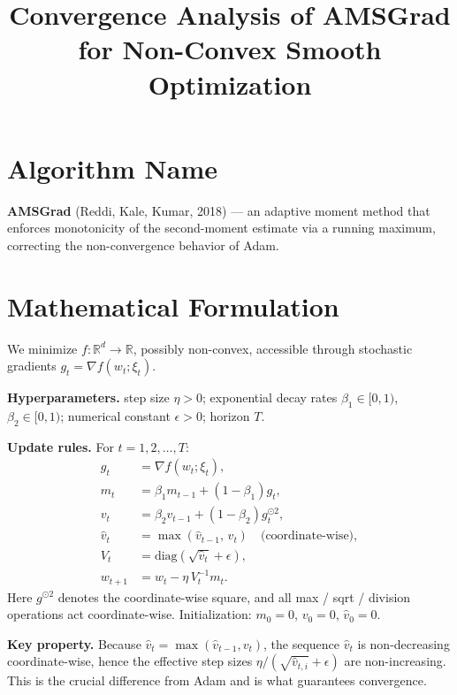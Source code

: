 \documentclass[11pt]{article}
\title{Convergence Analysis of AMSGrad for Non-Convex Smooth Optimization}
\author{}
\date{}
\begin{document}
\maketitle

\section*{Algorithm Name}
\textbf{AMSGrad} (Reddi, Kale, Kumar, 2018) --- an adaptive moment method that
enforces monotonicity of the second-moment estimate via a running maximum,
correcting the non-convergence behavior of Adam.

\section*{Mathematical Formulation}

We minimize $f:\mathbb{R}^d \to \mathbb{R}$, possibly non-convex, accessible
through stochastic gradients $g_t = \nabla f(w_t;\xi_t)$.

\textbf{Hyperparameters.} step size $\eta>0$; exponential decay rates
$\beta_1\in[0,1)$, $\beta_2\in[0,1)$; numerical constant $\epsilon>0$;
horizon $T$.

\textbf{Update rules.} For $t = 1,2,\dots,T$:
\begin{align}
g_t      &= \nabla f(w_t;\xi_t), \\
m_t      &= \beta_1 m_{t-1} + (1-\beta_1) g_t, \\
v_t      &= \beta_2 v_{t-1} + (1-\beta_2) g_t^{\odot 2}, \\
\hat v_t &= \max(\hat v_{t-1},\, v_t) \quad\text{(coordinate-wise)}, \\
V_t      &= \mathrm{diag}\!\left(\sqrt{\hat v_t}+\epsilon\right), \\
w_{t+1}  &= w_t - \eta\, V_t^{-1} m_t .
\end{align}
Here $g^{\odot 2}$ denotes the coordinate-wise square, and all max / sqrt /
division operations act coordinate-wise. Initialization:
$m_0 = 0$, $v_0 = 0$, $\hat v_0 = 0$.

\textbf{Key property.} Because $\hat v_t = \max(\hat v_{t-1}, v_t)$, the
sequence $\hat v_t$ is non-decreasing coordinate-wise, hence the effective
step sizes $\eta/(\sqrt{\hat v_{t,i}}+\epsilon)$ are non-increasing. This is the
crucial difference from Adam and is what guarantees convergence.
\end{document}
